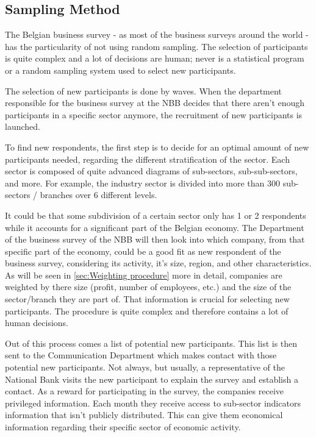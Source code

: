 \documentclass[12pt,a4paper,oneside]{book}
\begin{document}
\subsection{Sampling Method}
\label{sec:Recruitment of participants}

The Belgian business survey - as most of the business surveys around the world - has the particularity of not using random sampling. 
The selection of participants is quite complex and a lot of decisions are human; never is a statistical program or a random sampling system used to select new participants.

The selection of new participants is done by waves. When the department responsible for the business survey at the NBB decides that there aren't enough participants in a specific sector anymore, the recruitment of new participants is launched.

To find new respondents, the first step is to decide for an optimal amount of new participants needed, regarding the different stratification of the sector.
Each sector is composed of quite advanced diagrams of sub-sectors, sub-sub-sectors, and more. For example, the industry sector is divided into more than 300 sub-sectors / branches over 6 different levels. 

It could be that some subdivision of a certain sector only has 1 or 2 respondents while it accounts for a significant part of the Belgian economy. The Department of the business survey of the NBB will then look into which company, from that specific part of the economy, could be a good fit as new respondent of the business survey, considering its activity, it's size, region, and other characteristics.
As will be seen in \autoref{sec:Weighting procedure} more in detail, companies are weighted by there size (profit, number of employees, etc.) and the size of the sector/branch they are part of. That information is crucial for selecting new participants.
The procedure is quite complex and therefore contains a lot of human decisions.
 
Out of this process comes a list of potential new participants. This list is then sent to the Communication Department which makes contact with those potential new participants. 
Not always, but usually, a representative of the National Bank visits the new participant to explain the survey and establish a contact.
As a reward for participating in the survey, the companies receive privileged information. Each month they receive access to sub-sector indicators information that isn't publicly distributed. This can give them economical information regarding their specific sector of economic activity.
\end{document}
